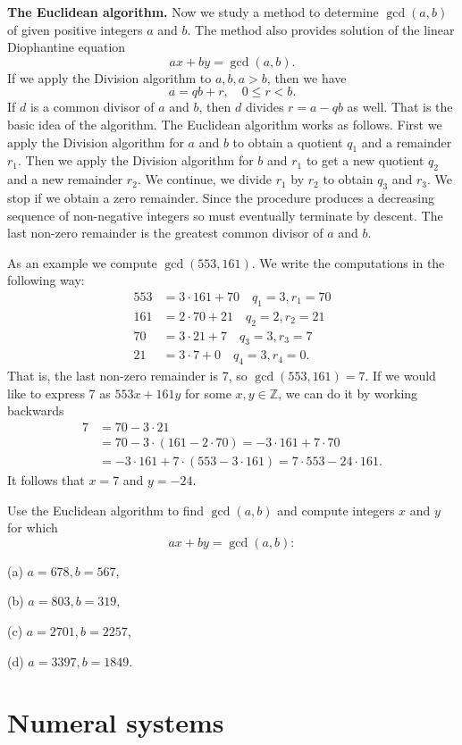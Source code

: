 {\bf The Euclidean algorithm.} Now we study a method to determine $\gcd(a,b)$ of given positive integers $a$ and $b$.
The method also provides solution of the linear Diophantine equation
$$
ax+by=\gcd(a,b).
$$
If we apply the Division algorithm to $a,b,a>b$, then we have
$$
a=qb+r,\quad 0\leq r<b.
$$
If $d$ is a common divisor of $a$ and $b$, then $d$ divides $r=a-qb$ as well. That is the basic idea of the algorithm.
The Euclidean algorithm works as follows. First we apply the Division algorithm for $a$ and $b$ to obtain a quotient $q_1$ and a remainder $r_1$.
Then we apply the Division algorithm for $b$ and $r_1$ to get a new quotient $q_2$ and a new remainder $r_2$. We continue, we divide
$r_1$ by $r_2$ to obtain $q_3$ and $r_3$. We stop if we obtain a zero remainder. Since the procedure produces a decreasing sequence of non-negative integers
so must eventually terminate by descent.
The last non-zero remainder is the greatest common divisor
of $a$ and $b$.

As an example we compute $\gcd(553,161)$. We write the computations in the following way:
\begin{align*}
553&=3\cdot 161+70\quad q_1=3, r_1=70\\
161&=2\cdot 70+21\quad q_2=2, r_2=21\\
70&=3\cdot 21+7\quad q_3=3, r_3=7\\
21&=3\cdot 7+0\quad q_4=3, r_4=0.
\end{align*}
That is, the last non-zero remainder is 7, so $\gcd(553,161)=7$.
If we would like to express 7 as $553x+161y$ for some $x,y\in\mathbb{Z}$, we can do it by working backwards
\begin{align*}
7&=70-3\cdot 21\\
 &=70-3\cdot (161-2\cdot 70)=-3\cdot 161+7\cdot 70\\
 &=-3\cdot 161+7 \cdot (553-3\cdot 161)=7\cdot 553-24\cdot 161.
\end{align*}
It follows that $x=7$ and $y=-24$.

\begin{exercise}\label{intro-ex-13}
Use the Euclidean algorithm to find $\gcd(a,b)$ and compute integers $x$ and $y$ for which
$$
ax+by=\gcd(a,b):
$$

(a) $a=678, b=567$,

(b) $a=803, b=319$,

(c) $a=2701, b=2257$,

(d) $a=3397, b=1849$.
\end{exercise}

\section{Numeral systems}\label{sec:numeralsystem}

